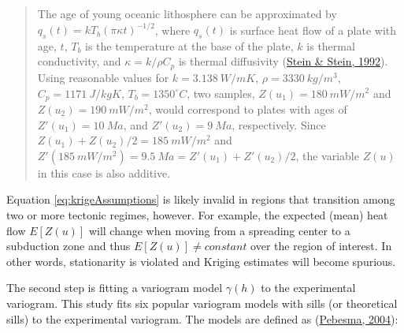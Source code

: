 \begin{quote}
The age of young oceanic lithosphere can be approximated by \(q_s(t) = kT_b(\pi\kappa t)^{-1/2}\), where \(q_s(t)\) is surface heat flow of a plate with age, \(t\), \(T_b\) is the temperature at the base of the plate, \(k\) is thermal conductivity, and \(\kappa = k/\rho C_p\) is thermal diffusivity (\protect\hyperlink{ref-stein1992}{Stein \& Stein, 1992}). Using reasonable values for \(k = 3.138~W/mK\), \(\rho = 3330~kg/m^3\), \(C_p = 1171~J/kgK\), \(T_b = 1350^{\circ}C\), two samples, \(Z(u_1) = 180~mW/m^2\) and \(Z(u_2) = 190~mW/m^2\), would correspond to plates with ages of \(Z'(u_1) = 10~Ma\), and \(Z'(u_2) = 9~Ma\), respectively. Since \(Z(u_1) + Z(u_2) / 2 = 185~mW/m^2\) and \(Z'(185~mW/m^2) = 9.5~Ma = Z'(u_1) + Z'(u_2) / 2\), the variable \(Z(u)\) in this case is also additive.
\end{quote}

Equation \eqref{eq:krigeAssumptions} is likely invalid in regions that transition among two or more tectonic regimes, however. For example, the expected (mean) heat flow \(E[Z(u)]\) will change when moving from a spreading center to a subduction zone and thus \(E[Z(u)] \neq constant\) over the region of interest. In other words, stationarity is violated and Kriging estimates will become spurious.

The second step is fitting a variogram model \(\gamma(h)\) to the experimental variogram. This study fits six popular variogram models with sills (or theoretical sills) to the experimental variogram. The models are defined as (\protect\hyperlink{ref-pebesma2004}{Pebesma, 2004}):

